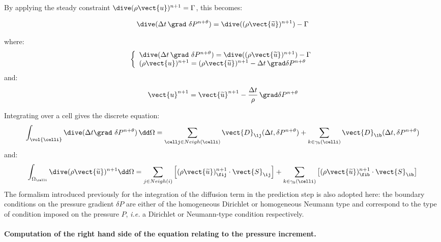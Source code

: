 By applying the steady constraint $\dive(\rho\vect{u})^{n+1}=\Gamma$,
this becomes:

\begin{equation}
\dive(\Delta t\, \grad\ \delta P^{n+\theta})=\dive((\rho \vect{\widetilde{u}})^{n+1})-\Gamma
\end{equation}

where:
\begin{equation}
\left\{\begin{array}{l}
\dive(\Delta t\, \grad\ \delta P^{n+\theta})=\dive((\rho \vect{\widetilde{u}})^{n+1})-\Gamma\\
(\rho\vect{u})^{n+1} = (\rho\vect{\widetilde{u}})^{n+1}-\Delta t\, \grad \delta P^{n+\theta}
\end{array}\right.
\end{equation}
and:
\begin{equation}
\label{eq:navstv:discrete_correction_velocity}
\vect{u}^{n+1} = \vect{\widetilde{u}}^{n+1}-\frac{\Delta t}{\rho}\, \grad\delta
P^{n+\theta}
\end{equation}

Integrating over a cell gives the discrete equation:
\begin{equation}
\int_{\vol{\celli}}{\dive(\Delta t \grad\ \delta P^{n+\theta})\, \dd\Omega} =
\sum\limits_{\cellj \in Neigh(\celli)}{\vect{D}_{\ij}(\Delta t, \delta P^{n+\theta})}
+\sum_{k\in {\gamma_b(\celli)}} {\vect{D}_{\ib}(\Delta t, \delta P^{n+\theta})}
\label{eq:navstv:discrete_correction_step}
\end{equation}
and:
\begin{equation}
\int_{\Omega_\celli}{\dive(\rho \vect{\widetilde{u}})^{n+1}  \dd \Omega} =
\sum_{j\in Neigh{(i)}}{\left[ (\rho
\vect{\widetilde{u}})^{n+1}_{\fij} \cdot \vect{S}_{\ij}\right]}
+\sum_{k\in {\gamma_b(\celli)}} \left[{(\rho \vect{\widetilde{u}})^{n+1}_{\fib}} \cdot \vect{S}_{\ib}\right]
\end{equation}
The formalism introduced previously for the integration of the diffusion term in
the prediction step is also adopted here: the boundary conditions on the
pressure gradient $\delta P$ are either of the homogeneous Dirichlet or
homogeneous Neumann type and correspond to the type of condition imposed
on the pressure $P$, \emph{i.e.} a Dirichlet or Neumann-type condition
respectively.

\paragraph{Computation of the right hand side of the equation relating to the
pressure increment.\\ }

